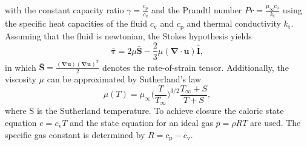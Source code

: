 \documentclass[11pt,a4paper,openany,oneside,parskip=half*]{article}
\renewcommand*\vec[1]{\boldsymbol{#1}}
\renewcommand*\matrix[1]{\boldsymbol{#1}}
\begin{document}
with the constant capacity ratio $\gamma = \frac{c_p}{c_v}$ and the Prandtl number
$ Pr = \frac{\mu_\infty c_\mathrm{p}}{k_\mathrm{t}}$
using the specific heat capacities of the fluid $ c_\mathrm{v} $ and $ c_\mathrm{p} $ and thermal conductivity $k_\mathrm{t}$.
Assuming that the fluid is newtonian, the Stokes hypothesis yields
\begin{equation}
 \matrix{\bar{\tau}} = 2 \mu \matrix{\bar{S}} - \frac{2}{3} \mu (\vec\nabla \cdot \vec{u}) \matrix{\bar{I}},
\end{equation}
in which $ \matrix{\bar{S}} = \frac{(\vec\nabla \vec{u})(\vec\nabla \vec{u})^T}{2} $ denotes the rate-of-strain tensor. Additionally, the viscosity
$ \mu $ can be approximated by Sutherland's law
\begin{equation}
 \mu (T) = \mu_\infty \biggl(\frac{T}{T_\infty}\biggl)^{3/2} \frac{T_\infty + S}{T + S},
\end{equation}
where S is the Sutherland temperature.
To achieve closure the caloric state equation $ e = c_\mathrm{v} T $ and the state equation for an ideal gas $
p = \rho R T $ are used. The specific gas constant is determined by $ R = c_\mathrm{p} - c_\mathrm{v} $. 
\newline
\end{document}
